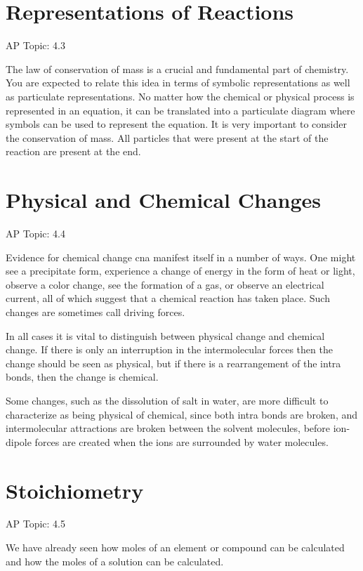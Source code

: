 \documentclass[../chem.tex]{subfiles}
\begin{document}
\section{Representations of Reactions}
AP Topic: 4.3

The law of conservation of mass is a crucial and fundamental part of chemistry. You are expected to relate this idea in terms of symbolic 
representations as well as particulate representations. No matter how the chemical or physical process is represented in an equation, 
it can be translated into a particulate diagram where symbols can be used to represent the equation. It is very important to consider the 
conservation of mass. All particles that were present at the start of the reaction are present at the end.

\section{Physical and Chemical Changes}
AP Topic: 4.4

Evidence for chemical change cna manifest itself in a number of ways. One might see a precipitate form, experience a change of energy in 
the form of heat or light, observe a color change, see the formation of a gas, or observe an electrical current, all of which suggest that 
a chemical reaction has taken place. Such changes are sometimes call driving forces.

In all cases it is vital to distinguish between physical change and chemical change. If there is only an interruption in the intermolecular
forces then the change should be seen as physical, but if there is a rearrangement of the intra bonds, then the change is chemical.

Some changes, such as the dissolution of salt in water, are more difficult to characterize as being physical of chemical, since both intra bonds 
are broken, and intermolecular attractions are broken between the solvent molecules, before ion-dipole forces are created when the ions are surrounded by water molecules.

\section{Stoichiometry}
AP Topic: 4.5 

We have already seen how moles of an element or compound can be calculated and how the moles of a solution can be calculated.
\end{document}
